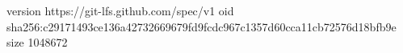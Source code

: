 version https://git-lfs.github.com/spec/v1
oid sha256:c29171493ce136a42732669679fd9fcdc967c1357d60cca11cb72576d18bfb9e
size 1048672

